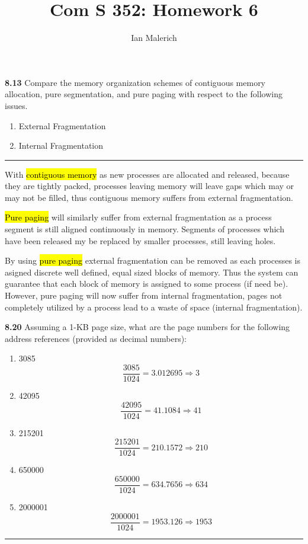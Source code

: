 \documentclass[12pt]{jhwhw}
\author{Ian Malerich}
\title{Com S 352: Homework 6}
\begin{document}
\raggedright

\textbf{8.13}  
	Compare the memory organization schemes of contiguous memory allocation, 
	pure segmentation, and pure paging with respect to the following issues.
	\begin{enumerate}
		\item External Fragmentation
		\item Internal Fragmentation
	\end{enumerate}
\textcolor[RGB]{240,240,240}{\rule{\textwidth}{0.5pt}}\bigbreak

	\begin{addmargin}[1em]{}
		With \hl{contiguous memory} as new processes are allocated and released, because they are tightly
		packed, processes leaving memory will leave gaps which may or may not be filled, thus contiguous
		memory suffers from external fragmentation.

		\bigbreak
		\hl{Pure paging} will similarly suffer from external fragmentation as a process segment is still
		aligned continuously in memory. Segments of processes which have been released my be replaced
		by smaller processes, still leaving holes.

		\bigbreak
		By using \hl{pure paging} external fragmentation can be removed as each processes is asigned
		discrete well defined, equal sized blocks of memory. Thus the system can guarantee that
		each block of memory is assigned to some process (if need be). However, pure paging will
		now suffer from internal fragmentation, pages not completely utilized by a process
		lead to a waste of space (internal fragmentation).
	\end{addmargin}

\bigbreak
\textbf{8.20}  
	Assuming a 1-KB page size, what are the page numbers for the following address
	references (provided as decimal numbers):
	\begin{enumerate}
		\item 3085 
			$$ \frac{3085}{1024} = 3.012695 \Rightarrow 3$$
		\item 42095
			$$ \frac{42095}{1024} = 41.1084 \Rightarrow 41$$
		\item 215201
			$$ \frac{215201}{1024} = 210.1572 \Rightarrow 210$$
		\item 650000
			$$ \frac{650000}{1024} = 634.7656 \Rightarrow 634$$
		\item 2000001
			$$ \frac{2000001}{1024} = 1953.126 \Rightarrow 1953$$
	\end{enumerate}
\textcolor[RGB]{240,240,240}{\rule{\textwidth}{0.5pt}}\bigbreak
\end{document}
